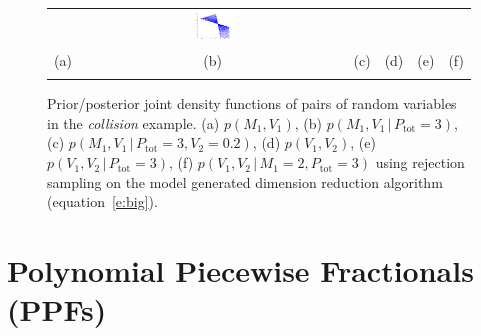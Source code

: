 \documentclass[letterpaper]{article}
\newcommand{\pr}{p}
\newcommand{\nn}{0.16}
\begin{document}
\begin{figure}
\begin{center}
\begin{tabular}{cccccc}
& \hspace{-3mm} \includegraphics[width=\nn\textwidth]{../Figs/colV1V2givenPis3M1is2.png}
\vspace{-1.5mm}
\\
   \hspace{-5mm} \footnotesize(a) 
& \hspace{-4mm} \footnotesize(b) 
& \hspace{-3mm} \footnotesize(c) 
&\hspace{-1mm} \footnotesize(d) 
&\hspace{-1mm} \footnotesize(e) 
&\hspace{-1mm} \footnotesize(f)\\
\multicolumn{6}{c}{}
\end{tabular}
\end{center}
\vspace{-8mm}
\caption{\footnotesize
Prior/posterior joint density functions of pairs of random variables in the \emph{collision} example. 
(a) $\pr(M_1, V_1)$,
(b) $\pr(M_1, V_1 \, | \, P_\text{tot} = 3)$,
(c) $\pr(M_1, V_1 \, | \, P_\text{tot} = 3, V_2 = 0.2)$,
(d) $\pr(V_1, V_2)$,
(e) $\pr(V_1, V_2 \, | \, P_\text{tot} = 3)$,
(f) $\pr(V_1, V_2 \, | \, M_1 =2, P_\text{tot} = 3)$
using rejection sampling on the model generated dimension reduction algorithm (equation~\ref{e:big}).
} 
\label{fig:mom}
\end{figure}




\section{Polynomial Piecewise Fractionals 
(PPFs)}
\label{sect:ppfs}
\end{document}

